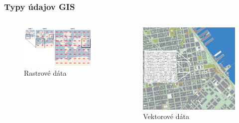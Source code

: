 \documentclass{beamer}
\begin{document}
\begin{frame}[fragile=singleslide]\frametitle{Typy údajov GIS}
\begin{columns}
	\begin{column}{0.5\textwidth}
		\begin{figure}[h]
			\centering
			\includegraphics[scale=0.2]{diagram5.png}
			\caption{Rastrové dáta}
			\label{fig:raster}
		\end{figure}
	\end{column}
	
	\begin{column}{0.5\textwidth}
		\begin{figure}[h]
			\centering
			\includegraphics[scale=0.2]{diagram6a.jpg}
			\caption{Vektorové dáta}
			\label{fig:vector}
		\end{figure}
	\end{column}
\end{columns}
\end{frame}
\end{document}
